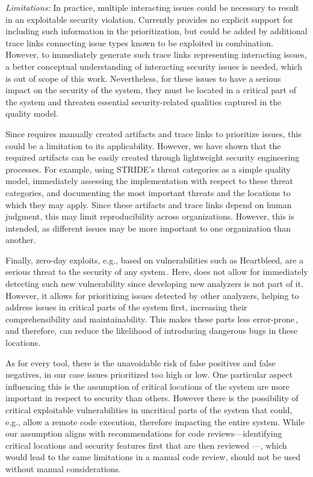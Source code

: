 \textit{Limitations:}
In practice, multiple interacting issues could be necessary to result in an exploitable security violation.
Currently \appr{} provides no explicit support for including such information in the prioritization, but could be added by additional trace links connecting issue types known to be exploited in combination.
However, to immediately generate such trace links representing interacting issues, a better conceptual understanding of interacting security issues is needed, which is out of scope of this work.
Nevertheless, for these issues to have a serious impact on the security of the system, they must be located in a critical part of the system and threaten essential security-related qualities captured in the quality model.

	Since \appr{} requires manually created artifacts and trace links to prioritize issues, this could be a limitation to its applicability.
However, we have shown that the required artifacts can be easily created through lightweight security engineering processes.
For example, using STRIDE's threat categories as a simple quality model, immediately assessing the implementation with respect to these threat categories, and documenting the most important threats and the locations to which they may apply.
Since these artifacts and trace links depend on human judgment, this may limit reproducibility across organizations.
However, this is intended, as different issues may be more important to one organization than another.

	Finally, zero-day exploits, e.g., based on vulnerabilities such as Heartbleed, are a serious threat to the security of any system\,\cite{Bilge2012}.
	Here, \appr{} does not allow for immediately detecting such new vulnerability since developing new analyzers is not part of it.
	However, it allows for prioritizing issues detected by other analyzers, helping to address issues in critical parts of the system first, increasing their comprehensibility and maintainability.
	This makes these parts less error-prone\,\cite{FV15}, and therefore, can reduce the likelihood of introducing dangerous bugs in these locations.

		As for every tool, there is the unavoidable risk of false positives and false negatives, in our case issues prioritized too high or low.
		One particular aspect influencing this is the assumption of critical locations of the system are more important in respect to security than others.
		However there is the possibility of critical exploitable vulnerabilities in uncritical parts of the system that could, e.g., allow a remote code execution, therefore impacting the entire system.
		While our assumption aligns with recommendations for code reviews---identifying critical locations and security features first that are then reviewed \cite{Howard2006}---, which would lead to the same limitations in a manual code review, \appr{} should not be used without manual considerations.